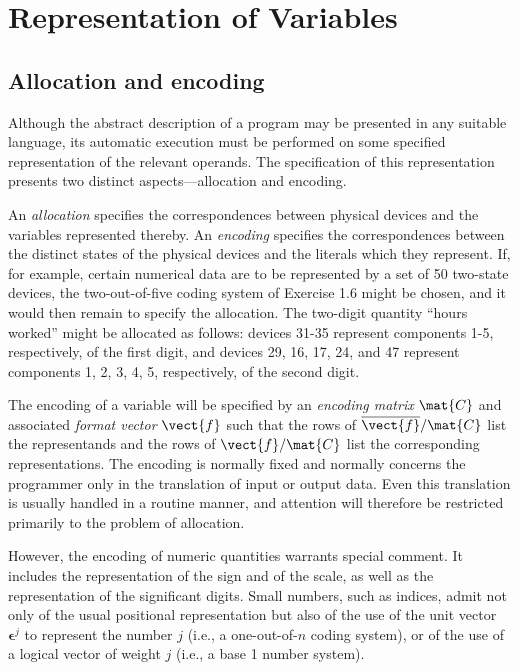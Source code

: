 ﻿
\chapter{Representation of Variables}

\section{Allocation and encoding}

\par Although the abstract description of a program may be presented in any suitable language, its automatic execution must be performed on some specified representation of the relevant operands. The specification of this representation presents two distinct aspects---allocation and encoding.

\par An \textit{allocation} specifies the correspondences between physical devices and the variables represented thereby. An \textit{encoding} specifies the correspondences between the distinct states of the physical devices and the literals which they represent. If, for example, certain numerical data are to be represented by a set of 50 two-state devices, the two-out-of-five coding system of Exercise 1.6 might be chosen, and it would then remain to specify the allocation. The two-digit quantity ``hours worked'' might be allocated as follows: devices 31-35 represent components 1-5, respectively, of the first digit, and devices 29, 16, 17, 24, and 47 represent components 1, 2, 3, 4, 5, respectively, of the second digit.

\par The encoding of a variable will be specified by an \textit{encoding matrix} $\mat{C}$ and associated \textit{format vector} $\vect{f}$ such that the rows of $\overline{\vect{f}}/\mat{C}$ list the representands and the rows of $\vect{f}/\mat{C}$ list the corresponding representations. The encoding is normally fixed and normally concerns the programmer only in the translation of input or output data. Even this translation is usually handled in a routine manner, and attention will therefore be restricted primarily to the problem of allocation.

\par However, the encoding of numeric quantities warrants special comment. It includes the representation of the sign and of the scale, as well as the representation of the significant digits. Small numbers, such as indices, admit not only of the usual positional representation but also of the use of the unit vector $\textbf{ϵ}^j$ to represent the number $j$ (i.e., a one-out-of-$n$ coding system), or of the use of a logical vector of weight $j$ (i.e., a base 1 number system).


